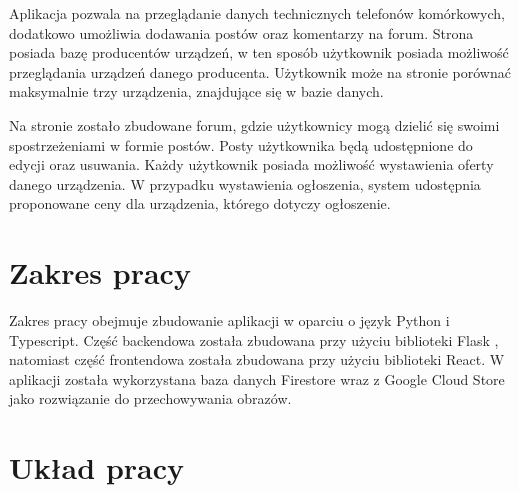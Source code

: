 Aplikacja pozwala na przeglądanie danych technicznych telefonów komórkowych, dodatkowo umożliwia dodawania postów oraz komentarzy na forum. Strona posiada bazę producentów urządzeń, w ten sposób użytkownik posiada możliwość przeglądania urządzeń danego producenta. Użytkownik może na stronie porównać maksymalnie trzy urządzenia, znajdujące się w bazie danych.

Na stronie zostało zbudowane forum, gdzie użytkownicy mogą dzielić się swoimi spostrzeżeniami w formie postów. Posty użytkownika będą udostępnione do edycji oraz usuwania. Każdy użytkownik posiada możliwość wystawienia oferty danego urządzenia. W przypadku wystawienia ogłoszenia, system udostępnia proponowane ceny dla urządzenia, którego dotyczy ogłoszenie.

\section{Zakres pracy}
Zakres pracy obejmuje zbudowanie aplikacji w oparciu o język Python \cite{python} i Typescript\cite*{TypeScript}. Część backendowa została zbudowana przy użyciu biblioteki Flask \cite{flask}, natomiast część frontendowa została zbudowana przy użyciu biblioteki React. W aplikacji została wykorzystana baza danych Firestore wraz z Google Cloud Store jako rozwiązanie do przechowywania obrazów. 

\section{Układ pracy}
